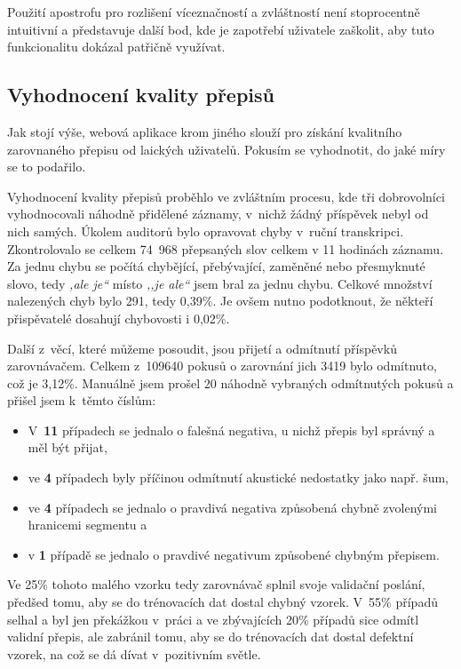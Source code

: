 Použití apostrofu pro rozlišení víceznačností a zvláštností není stoprocentně
intuitivní a představuje další bod, kde je zapotřebí uživatele zaškolit, aby
tuto funkcionalitu dokázal patřičně využívat.

\subsection{Vyhodnocení kvality přepisů}

Jak stojí výše, webová aplikace krom jiného slouží pro získání kvalitního
zarovnaného přepisu od laických uživatelů. Pokusím se vyhodnotit, do jaké míry
se to podařilo.

Vyhodnocení kvality přepisů proběhlo ve zvláštním procesu, kde tři dobrovolníci
vyhodnocovali náhodně přidělené záznamy, v~nichž žádný příspěvek nebyl od nich
samých. Úkolem auditorů bylo opravovat chyby v~ruční transkripci. Zkontrolovalo
se celkem 74~968 přepsaných slov celkem v 11 hodinách záznamu. Za jednu chybu se počítá
chybějící, přebývající, zaměněné nebo přesmyknuté slovo, tedy \textit{,ale je``} místo
\textit{,,je ale``} jsem bral za jednu chybu. Celkové množství nalezených chyb
bylo 291, tedy 0,39\%. Je ovšem nutno podotknout, že někteří přispěvatelé
dosahují chybovosti i 0,02\%.

Další z~věcí, které můžeme posoudit, jsou přijetí a odmítnutí příspěvků
zarovnávačem. Celkem z~109640 pokusů o zarovnání jich 3419 bylo odmítnuto, což
je 3,12\%. Manuálně jsem prošel 20 náhodně vybraných odmítnutých pokusů a
přišel jsem k~těmto číslům:
\begin{itemize}
\item{
    V~\textbf{11} případech se jednalo o falešná negativa, u nichž přepis byl
    správný a měl být přijat,
}
\item{
    ve \textbf{4} případech byly příčinou odmítnutí akustické nedostatky jako
    např. šum,
}
\item{
    ve \textbf{4} případech se jednalo o pravdivá negativa způsobená chybně
    zvolenými hranicemi segmentu a
}
\item{
     v \textbf{1} případě se jednalo o pravdivé negativum způsobené chybným
    přepisem.
}
\end{itemize}

Ve 25\% tohoto malého vzorku tedy zarovnávač splnil svoje validační
poslání, předšed tomu, aby se do trénovacích dat dostal chybný vzorek. V~55\%
případů selhal a byl jen překážkou v~práci a ve zbývajících 20\%
případů sice odmítl validní přepis, ale zabránil tomu, aby se do trénovacích dat
dostal defektní vzorek, na což se dá dívat v~pozitivním světle.

